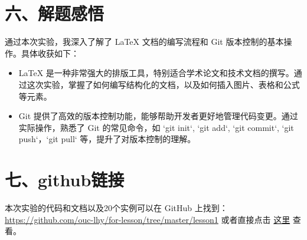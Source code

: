 \documentclass[a4paper, 12pt]{article}
\begin{document}
\section*{六、解题感悟}
通过本次实验，我深入了解了 LaTeX 文档的编写流程和 Git 版本控制的基本操作。具体收获如下：
\begin{itemize}
    \item LaTeX 是一种非常强大的排版工具，特别适合学术论文和技术文档的撰写。通过这次实验，掌握了如何编写结构化的文档，以及如何插入图片、表格和公式等元素。
    \item Git 提供了高效的版本控制功能，能够帮助开发者更好地管理代码变更。通过实际操作，熟悉了 Git 的常见命令，如 `git init`, `git add`, `git commit`, `git push`，`git pull` 等，提升了对版本控制的理解。
\end{itemize}

\section*{七、github链接}

本次实验的代码和文档以及20个实例可以在 GitHub 上找到：\url{https://github.com/ouc-lhy/for-lesson/tree/master/lesson1} 或者直接点击 \href{https://github.com/ouc-lhy/for-lesson/tree/master/lesson1}{这里} 查看。
\end{document}

